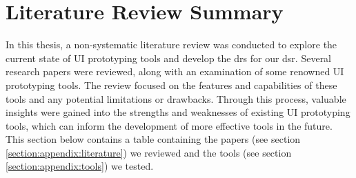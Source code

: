 
\chapter{Literature Review Summary}
\label{appendix:two:definations}

In this thesis, a non-systematic literature review was conducted to explore the current state of UI prototyping tools and develop the \ac{dr}s for our \ac{dsr}. 
Several research papers were reviewed, along with an examination of some renowned UI prototyping tools. 
The review focused on the features and capabilities of these tools and any potential limitations or drawbacks. 
Through this process, valuable insights were gained into the strengths and weaknesses of existing UI prototyping tools, which can inform the development of more effective tools in the future. 
This section below contains a table containing the papers (see section \ref{section:appendix:literature}) we reviewed and the tools (see section \ref{section:appendix:tools}) we tested.  

